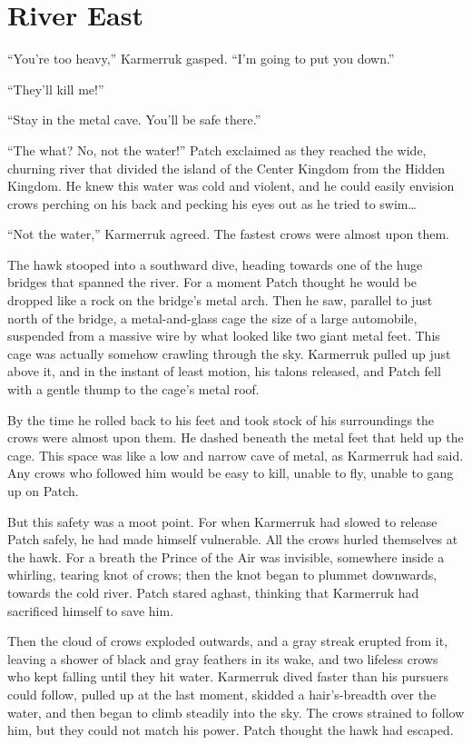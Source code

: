 \documentclass[ebook,oneside,openany,12pt]{memoir}
\begin{document}

\section{River East}

“You’re too heavy,” Karmerruk gasped. “I’m going to put you down.”

“They’ll kill me!”

“Stay in the metal cave. You’ll be safe there.”

“The what? No, not the water!” Patch exclaimed as they reached the
wide, churning river that divided the island of the Center Kingdom
from the Hidden Kingdom. He knew this water was cold and violent, and
he could easily envision crows perching on his back and pecking his
eyes out as he tried to swim…

“Not the water,” Karmerruk agreed. The fastest crows were almost upon
them.

The hawk stooped into a southward dive, heading towards one of the
huge bridges that spanned the river. For a moment Patch thought he
would be dropped like a rock on the bridge’s metal arch. Then he saw,
parallel to just north of the bridge, a metal-and-glass cage the size
of a large automobile, suspended from a massive wire by what looked
like two giant metal feet. This cage was actually somehow crawling
through the sky. Karmerruk pulled up just above it, and in the instant
of least motion, his talons released, and Patch fell with a gentle
thump to the cage’s metal roof.

By the time he rolled back to his feet and took stock of his
surroundings the crows were almost upon them. He dashed beneath the
metal feet that held up the cage. This space was like a low and narrow
cave of metal, as Karmerruk had said. Any crows who followed him would
be easy to kill, unable to fly, unable to gang up on Patch.

But this safety was a moot point. For when Karmerruk had slowed to
release Patch safely, he had made himself vulnerable. All the crows
hurled themselves at the hawk. For a breath the Prince of the Air was
invisible, somewhere inside a whirling, tearing knot of crows; then
the knot began to plummet downwards, towards the cold river. Patch
stared aghast, thinking that Karmerruk had sacrificed himself to save
him.

Then the cloud of crows exploded outwards, and a gray streak erupted
from it, leaving a shower of black and gray feathers in its wake, and
two lifeless crows who kept falling until they hit water. Karmerruk
dived faster than his pursuers could follow, pulled up at the last
moment, skidded a hair’s-breadth over the water, and then began to
climb steadily into the sky. The crows strained to follow him, but
they could not match his power. Patch thought the hawk had escaped.
\end{document}
